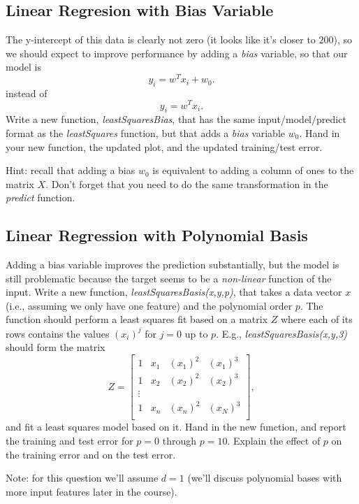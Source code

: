 \documentclass{article}
\def\blu#1{{\color{blu}#1}}
\begin{document}
\subsection{Linear Regresion with Bias Variable}

The y-intercept of this data is clearly not zero (it looks like it's closer to $200$), so we should expect to improve performance by adding a \emph{bias} variable, so that our model is
\[
y_i = w^Tx_i + w_0.
\]
instead of
\[
y_i = w^Tx_i.
\]
\blu{Write a new function, \emph{leastSquaresBias}, that has the same input/model/predict format as the \emph{leastSquares} function, but that adds a \emph{bias} variable $w_0$. Hand in your new function, the updated plot, and the updated training/test error.}

Hint: recall that adding a bias $w_0$ is equivalent to adding a column of ones to the matrix $X$. Don't forget that you need to do the same transformation in the \emph{predict} function.


\subsection{Linear Regression with Polynomial Basis}

Adding a bias variable improves the prediction substantially, but the model is still problematic because the target seems to be a \emph{non-linear} function of the input. Write a new function, \emph{leastSquaresBasis(x,y,p)}, that takes a data vector $x$ (i.e., assuming we only have one feature) and the polynomial order $p$. The function should perform a least squares fit based on a matrix $Z$ where each of its rows contains the values $(x_{i})^j$ for $j=0$ up to $p$. E.g., \emph{leastSquaresBasis(x,y,3)} should form the matrix
\[
Z = 
\left[\begin{array}{cccc}
1 & x_1 & (x_1)^2 & (x_1)^3\\
1 & x_2 & (x_2)^2 & (x_2)^3\\
\vdots\\
1 & x_n & (x_n)^2 & (x_N)^3\\
\end{array}
\right],
\]
and fit a least squares model based on it.
\blu{Hand in the new function, and report the training and test error for $p = 0$ through $p= 10$. Explain the effect of $p$ on the training error and on the test error.}

Note: for this question we'll assume $d=1$ (we'll discuss polynomial bases with more input features later in the course).
\end{document}
